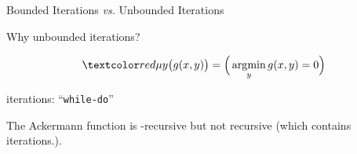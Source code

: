 
\begin{frame}{}
  \centerline{\LARGE Bounded Iterations \emph{vs.} Unbounded Iterations}

  \vspace{0.80cm}

  \vspace{0.40cm}
  \pause
  \centerline{\Large {} Why unbounded iterations?}
\end{frame}

\begin{frame}{}

  \vspace{0.20cm}
  \[
    \red{\mu} y \big(g(x, y)\big) = \Big(\argmin_{y} g(x,y) = 0\Big)
  \]

  \pause
  \centerline{ iterations: ``\texttt{while-do}''}

  \vspace{0.40cm}
  \pause
  \begin{theorem}
    The Ackermann function is \red{$\mu$}-recursive but not  recursive (which contains  iterations.).
  \end{theorem}
\end{frame}
